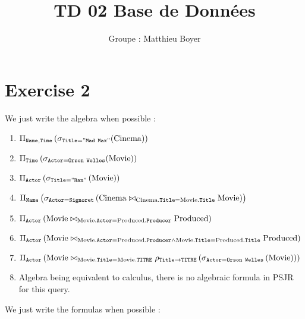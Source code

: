 \documentclass{cours}
\title{TD 02 Base de Données}
\author{Groupe : Matthieu Boyer}
\begin{document}

\section{Exercise 2}
We just write the algebra when possible : 
\begin{enumerate}
    \item $\Pi_{\tt Name,Time}\left(\sigma_{\tt Title = "Mad \ Max"}(\mathrm{Cinema})\right)$
    \item $\Pi_{\tt Time}\left(\sigma_{\tt Actor = Orson\ Welles}(\mathrm{Movie})\right)$
    \item $\Pi_{\tt Actor}\left(\sigma_{\tt Title = "Ran"}\left({\rm Movie}\right)\right)$
    \item $\Pi_{\tt Name}\left(\sigma_{\tt Actor = Signoret}\left(\mathrm{Cinema} \bowtie_{\tt {\rm Cinema}.Title = {\rm Movie}.Title} \mathrm{Movie}\right)\right)$
    \item $\Pi_{\tt Actor}\left({\rm Movie} \bowtie_{\tt {\rm Movie}.Actor = {\rm Produced}.Producer} {\rm Produced}\right)$
    \item $\Pi_{\tt Actor}\left({\rm Movie} \bowtie_{\tt {\rm Movie}.Actor = {\rm Produced}.Producer \land {\rm Movie}.Title = {\rm Produced}.Title} {\rm Produced}\right)$
    \item $\Pi_{\tt Actor}\left({\rm Movie} \bowtie_{\tt {\rm Movie}.Title = {\rm Movie}.TITRE} \rho_{\tt Title \rightarrow TITRE}\left(\sigma_{\tt Actor = Orson\ Welles}\left({\rm Movie}\right)\right)\right)$
    \item Algebra being equivalent to calculus, there is no algebraic formula in PSJR for this query. 
\end{enumerate}
We just write the formulas when possible : 
\end{document}
